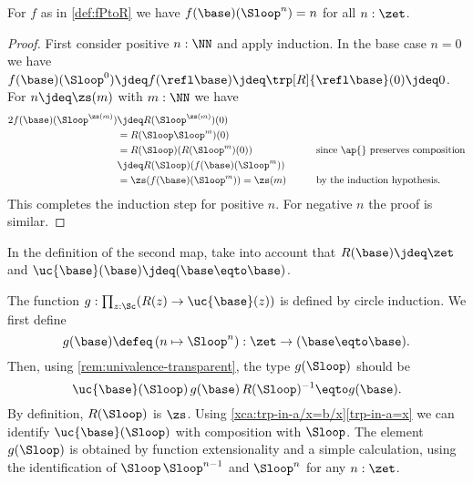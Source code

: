 \begin{lemma}\label{lem:windingnumber}
For $f$ as in \cref{def:fPtoR} we have $f(\base)(\Sloop^n)=n$ for all $n:\zet$.
\end{lemma}
\begin{proof}
First consider positive $n:\NN$ and apply induction. 
In the base case $n=0$ we have
$f(\base)(\Sloop^0)\jdeq f(\refl\base)\jdeq\trp[R]{\refl\base}(0) \jdeq 0$.
For $n\jdeq\zs(m)$ with $m:\NN$ we have
\begin{alignat*}2
  f(\base)(\Sloop^{\zs(m)})&\jdeq R(\Sloop^{\zs(m)})(0)&\qquad&\\
  &= R(\Sloop \Sloop^{m})(0)&&\\
  &= R(\Sloop)(R(\Sloop^m)(0))&&\text{since $\ap{}$ preserves composition}\\
  &\jdeq R(\Sloop)(f(\base)(\Sloop^{m}))&&\\
  &= \zs(f(\base)(\Sloop^{m})) = \zs(m)&&\text{by the induction hypothesis.}
\end{alignat*}
This completes the induction step for positive $n$.
For negative $n$ the proof is similar.
\end{proof}

In the definition of the second map,
take into account that $R(\base)\jdeq \zet$ and $\uc{\base}(\base) \jdeq (\base\eqto \base)$.

\begin{definition}\label{def:gRtoP}
The function $g:\prod_{z:\Sc}(R(z)\to \uc{\base}(z))$ is
defined by circle induction. We first define
\[
g(\base)\defeq \left(n \mapsto {\Sloop^n} \right) :\zet\to(\base\eqto \base).
\]
Then, using \cref{rem:univalence-transparent}, the type $g(\Sloop)$ should be
\[
\uc{\base}(\Sloop)\, g(\base)\,R(\Sloop)^{-1}\eqto g(\base).
\]
%
By definition,
$R(\Sloop)$ is $\zs$. Using \cref{xca:trp-in-a/x=b/x}\ref{trp-in-a=x}
we can identify $\uc{\base}(\Sloop)$ with composition with $\Sloop$.
The element $g(\Sloop)$ is obtained by function extensionality and
a simple calculation, using the identification of
${\Sloop\,\Sloop^{n-1}}$ and $\Sloop^n$ for any $n:\zet$.
\end{definition}

